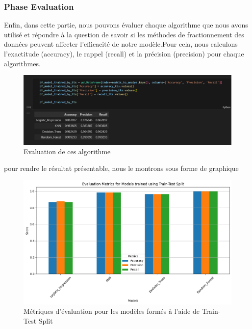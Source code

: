 \documentclass[a4paper,12pt]{report}
\begin{document}
\subsubsection{Phase Evaluation }
\noindent \normalsize Enfin, dans cette partie, nous pouvons évaluer chaque algorithme que nous avons utilisé et répondre à la question de savoir si les méthodes de fractionnement des données peuvent affecter l'efficacité de notre modèle.Pour cela, nous calculons l'exactitude (accuracy), le rappel (recall) et la précision (precision) pour chaque algorithmes.
\begin{figure}[H]
\centering
 \includegraphics[scale=0.8]{outils-images/data19.png}
\caption{Evaluation de ces algorithme}
\end{figure}

\noindent \normalsize pour rendre le résultat présentable, nous le montrons sous forme de graphique
\begin{figure}[H]
\centering
 \includegraphics[scale=0.6]{outils-images/data20.png}
\caption{Métriques d'évaluation pour les modèles formés à l'aide de Train-Test Split}
\end{figure}
\end{document}
